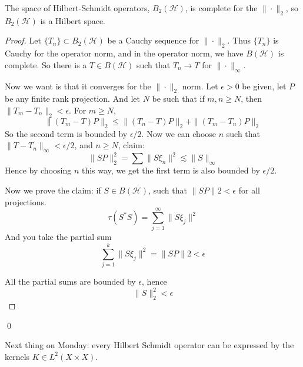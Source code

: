 \begin{theorem}
    The space of Hilbert-Schmidt operators, $B_2(\mathcal{H})$, is complete for the $\|\cdot\|_2$, so $B_2(\mathcal{H})$ is a Hilbert space.
\end{theorem}
\begin{proof}
    Let $\{T_n\}\subset B_2(\mathcal{H})$ be a Cauchy sequence for $\|\cdot\|_2$. Thus $\{T_n\}$ is Cauchy for the operator norm, and in the operator norm, we have $B(\mathcal{H})$ is complete. So there is a $T\in B(\mathcal{H})$ such that $T_n\to T$ for $\|\cdot\|_\infty$. 

    Now we want is that it converges for the $\|\cdot\|_2$ norm. Let $\epsilon>0$ be given, let $P$ be any finite rank projection. And let $N$ be such that if $m,n\geq N$, then $\|T_m-T_n\|_2<\epsilon$. For $m\geq N$,
    \begin{equation*}
        \|(T_m-T)P\|_2\leq\|(T_n-T)P\|_2+\|(T_m-T_n)P\|_2
    \end{equation*}
    So the second term is bounded by $\epsilon/2$.
    Now we can choose $n$ such that $\|T-T_n\|_\infty<\epsilon/2$, and $n\geq N$, claim:
    \begin{equation*}
        \|SP\|_2^2=\sum\|S\xi_n\|^2\lesssim \|S\|_\infty
    \end{equation*}
    Hence by choosing $n$ this way, we get the first term is also bounded by $\epsilon/2$.

    Now we prove the claim: if $S\in B(\mathcal{H})$, such that $\|SP\|2<\epsilon$ for all projections.
    \begin{equation*}
    \tau(S^*S)=\sum_{j=1}^\infty\|S\xi_j\|^2
    \end{equation*}
    And you take the partial sum 
    \begin{equation*}
    \sum_{j=1}^k\|S\xi_j\|^2=\|SP\|2<\epsilon
    \end{equation*}

    All the partial sums are bounded by $\epsilon$, hence 
    \begin{equation*}
    \|S\|_2^2<\epsilon
    \end{equation*}
\end{proof}
\qed

Next thing on Monday: every Hilbert Schmidt operator can be expressed by the kernels $K\in L^2(X\times X)$.



